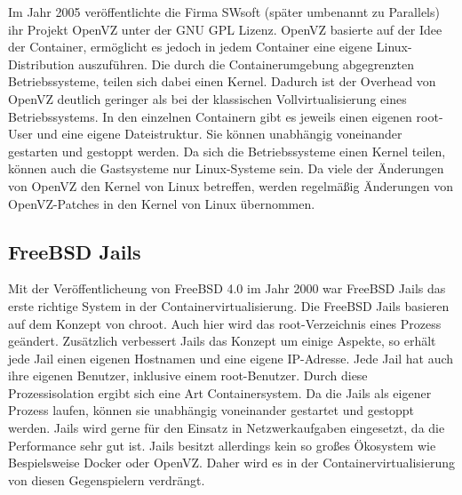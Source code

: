 Im Jahr 2005 veröffentlichte die Firma SWsoft (später umbenannt zu Parallels) ihr Projekt OpenVZ unter der GNU GPL Lizenz. OpenVZ basierte auf der Idee der Container, ermöglicht es jedoch in jedem Container eine eigene Linux-Distribution auszuführen.
Die durch die Containerumgebung abgegrenzten Betriebssysteme, teilen sich dabei einen Kernel. Dadurch ist der Overhead von OpenVZ deutlich geringer als bei der klassischen Vollvirtualisierung eines Betriebssystems.
In den einzelnen Containern gibt es jeweils einen eigenen root-User und eine eigene Dateistruktur.
Sie können unabhängig voneinander gestarten und gestoppt werden.
Da sich die Betriebssysteme einen Kernel teilen, können auch die Gastsysteme nur Linux-Systeme sein.
Da viele der Änderungen von OpenVZ den Kernel von Linux betreffen, werden regelmäßig Änderungen von OpenVZ-Patches in den Kernel von Linux übernommen.\cite{OpenVzNews, IEEE4803091,OpenVzHist}


\subsection{FreeBSD Jails}
\label{sec:jails}
Mit der Veröffentlicheung von FreeBSD 4.0 im Jahr 2000 war FreeBSD Jails das erste richtige System in der Containervirtualisierung.
Die FreeBSD Jails basieren auf dem Konzept von chroot. Auch hier wird das root-Verzeichnis eines Prozess geändert. Zusätzlich verbessert Jails das Konzept um einige Aspekte, so erhält jede Jail einen eigenen Hostnamen	und eine eigene IP-Adresse. Jede Jail hat auch ihre eigenen Benutzer, inklusive einem root-Benutzer. \cite{FreeBSDHB14} Durch diese Prozessisolation ergibt sich eine Art Containersystem. Da die Jails als eigener Prozess laufen, können sie unabhängig voneinander gestartet und gestoppt werden.  Jails wird gerne für den Einsatz in Netzwerkaufgaben eingesetzt, da die Performance sehr gut ist. Jails besitzt allerdings kein so großes Ökosystem wie Bespielsweise Docker oder OpenVZ. Daher wird es in der Containervirtualisierung von diesen Gegenspielern verdrängt.



